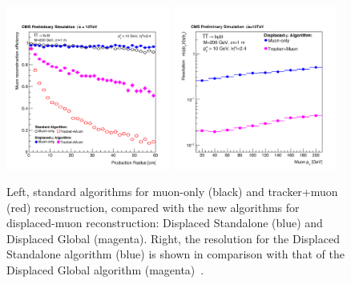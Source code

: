 \begin{figure}[h]
\centering
  \includegraphics[width=0.48\textwidth]{Figures/c2/newreco.pdf}
  \includegraphics[width=0.48\textwidth]{Figures/c2/newreco2.pdf}
  \caption{Left, standard algorithms for muon-only (black) and tracker+muon (red) reconstruction,
compared with the new algorithms for displaced-muon reconstruction: Displaced
Standalone (blue) and Displaced Global
(magenta). Right, the resolution for the Displaced Standalone algorithm (blue) is shown in comparison
with that of the Displaced Global algorithm (magenta)~\cite{CMS-DP-2015-015}.}
  \label{fig:newreco}
\end{figure}

